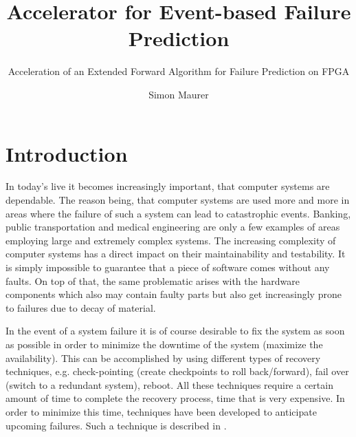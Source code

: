 \documentclass[mscthesis]{usiinfthesis}
\title{Accelerator for Event-based Failure Prediction} %
\subtitle{Acceleration of an Extended Forward Algorithm for Failure Prediction
    on FPGA}
\author{Simon Maurer} %
\begin{document}
\maketitle %

\frontmatter %

\begin{abstract}
\end{abstract}

%

\begin{acknowledgements}
\end{acknowledgements}

\tableofcontents 
\listoffigures %
\listoftables %
\lstlistoflistings

\mainmatter

\chapter{Introduction}
\label{ch:intro}
In today's live it becomes increasingly important, that computer systems are
dependable. The reason being, that computer systems are used more and more in
areas where the failure of such a system can lead to catastrophic events.
Banking, public transportation and medical engineering are only a few examples
of areas employing large and extremely complex systems. The increasing
complexity of computer systems has a direct impact on their maintainability and
testability. It is simply impossible to guarantee that a piece of software comes
without any faults. On top of that, the same problematic arises with the
hardware components which also may contain faulty parts but also get
increasingly prone to failures due to decay of material.

In the event of a system failure it is of course desirable to fix the system as
soon as possible in order to minimize the downtime of the system (maximize the
availability). This can be accomplished by using different types of recovery
techniques, e.g. check-pointing (create checkpoints to roll back/forward), fail
over (switch to a redundant system), reboot. All these techniques require
a certain amount of time to complete the recovery process, time that is very
expensive. In order to minimize this time, techniques have been developed to
anticipate upcoming failures. Such a technique is described in
\cite{salfner08}.
\end{document}
